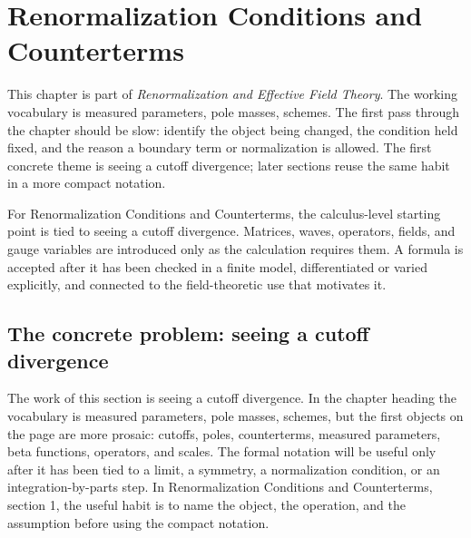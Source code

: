 \chapter{Renormalization Conditions and Counterterms}


This chapter is part of \emph{Renormalization and Effective Field Theory}.  The working vocabulary is measured parameters, pole masses, schemes.  The first pass through the chapter should be slow: identify the object being changed, the condition held fixed, and the reason a boundary term or normalization is allowed.  The first concrete theme is seeing a cutoff divergence; later sections reuse the same habit in a more compact notation.

For Renormalization Conditions and Counterterms, the calculus-level starting point is tied to seeing a cutoff divergence.  Matrices, waves, operators, fields, and gauge variables are introduced only as the calculation requires them.  A formula is accepted after it has been checked in a finite model, differentiated or varied explicitly, and connected to the field-theoretic use that motivates it.

\section{The concrete problem: seeing a cutoff divergence}













The work of this section is seeing a cutoff divergence.  In the chapter heading the vocabulary is measured parameters, pole masses, schemes, but the first objects on the page are more prosaic: cutoffs, poles, counterterms, measured parameters, beta functions, operators, and scales.  The formal notation will be useful only after it has been tied to a limit, a symmetry, a normalization condition, or an integration-by-parts step.  In Renormalization Conditions and Counterterms, section 1, the useful habit is to name the object, the operation, and the assumption before using the compact notation.

